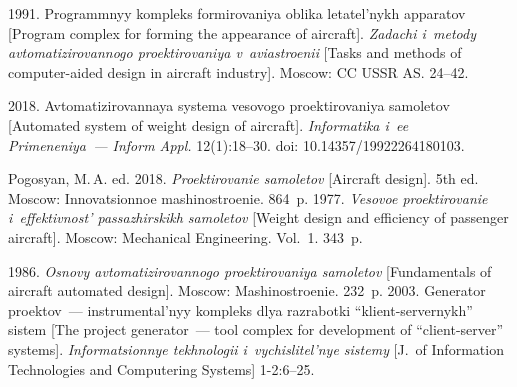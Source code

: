   \begin{multicols}{2}

\renewcommand{\bibname}{\protect\rmfamily References}

{\small\frenchspacing
 {%
 \begin{thebibliography}{9}
 
 
       1991. Programmnyy 
kompleks formirovaniya oblika letatel'nykh apparatov [Program complex for forming the 
appearance of aircraft]. \textit{Zadachi i~metody avtomatizirovannogo proektirovaniya 
v~aviastroenii} [Tasks and methods of computer-aided design in aircraft industry]. 
Moscow: CC USSR AS.
24--42.

\vspace*{-2pt}

       2018. Avtomatizirovannaya 
systema vesovogo proektirovaniya samoletov [Automated system of weight design of aircraft]. 
\textit{Informatika i~ee Primeneniya~--- Inform Appl.} 12(1):18--30. doi: 
10.14357/19922264180103.

\pagebreak

      Pogosyan, M.\,A. ed. 2018. \textit{Proektirovanie samoletov} [Aircraft design]. 5th ed. 
Moscow: Innovatsionnoe mashi\-no\-stro\-enie. 864~p. 
       1977. \textit{Vesovoe proektirovanie 
i~effektivnost' passazhirskikh samoletov} [Weight design and efficiency of passenger aircraft]. 
Moscow: Mechanical Engineering. Vol.~1. 343~p.


       1986. \textit{Osnovy 
avtomatizirovannogo proektirovaniya samoletov} [Fundamentals of aircraft automated design]. 
Moscow: Mashinostroenie. 232~p.
       2003. Generator proektov~--- instrumental'nyy kompleks dlya razrabotki 
      ``klient-servernykh'' sistem [The project generator~--- tool complex for development of 
``client-server'' systems]. \textit{Informatsionnye tekhnologii i~vychislitel'nye sistemy} 
[J.~of Information Technologies and Computering Systems] 1-2:6--25.

 \end{thebibliography}

 }
 }

\end{multicols}

